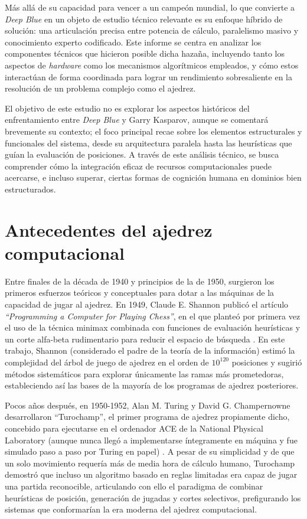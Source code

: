 \documentclass[a4paper, 12pt]{article}
\begin{document}
Más allá de su capacidad para vencer a un campeón mundial, lo 
que convierte a \textit{Deep Blue} en un objeto de estudio 
técnico relevante es su enfoque híbrido de solución: una 
articulación precisa entre potencia de cálculo, paralelismo 
masivo y conocimiento experto codificado. Este informe se centra 
en analizar los componentes técnicos que hicieron posible dicha 
hazaña, incluyendo tanto los aspectos de \emph{hardware} como los 
mecanismos algorítmicos empleados, y cómo estos interactúan de 
forma coordinada para lograr un rendimiento sobresaliente en la 
resolución de un problema complejo como el ajedrez.

El objetivo de este estudio no es explorar los aspectos 
históricos del enfrentamiento entre \textit{Deep Blue} y Garry 
Kasparov, aunque se comentará brevemente su contexto; el foco 
principal recae sobre los elementos estructurales y funcionales 
del sistema, desde su arquitectura paralela hasta las 
heurísticas que guían la evaluación de posiciones. A través de 
este análisis técnico, se busca comprender cómo la integración 
eficaz de recursos computacionales puede acercarse, e incluso 
superar, ciertas formas de cognición humana en dominios bien 
estructurados.


\newpage


\section{Antecedentes del ajedrez computacional}


Entre finales de la década de 1940 y principios de la de 1950, 
surgieron los primeros esfuerzos teóricos y conceptuales para 
dotar a las máquinas de la capacidad de jugar al ajedrez. En 
1949, Claude E. Shannon publicó el artículo \emph{“Programming a 
Computer for Playing Chess”}, en el que planteó por primera vez 
el uso de la técnica minimax combinada con funciones de 
evaluación heurísticas y un corte alfa-beta rudimentario para 
reducir el espacio de búsqueda \cite{shannon1950xxii}. En este 
trabajo, Shannon (considerado el padre de la teoría de la 
información) estimó la complejidad del árbol de juego de ajedrez 
en el orden de \(10^{120}\) posiciones y sugirió métodos 
sistemáticos para explorar únicamente las ramas más prometedoras, 
estableciendo así las bases de la mayoría de los programas de 
ajedrez posteriores.

Pocos años después, en 1950-1952, Alan M. Turing y David G. 
Champernowne desarrollaron “Turochamp”, el primer programa de 
ajedrez propiamente dicho, concebido para ejecutarse en el 
ordenador ACE de la National Physical Laboratory (aunque nunca 
llegó a implementarse íntegramente en máquina y fue simulado 
paso a paso por Turing en papel) \cite{turing1953digital}. A pesar de 
su simplicidad y de que un solo movimiento requería más de media 
hora de cálculo humano, Turochamp demostró que incluso un 
algoritmo basado en reglas limitadas era capaz de jugar una 
partida reconocible, articulando con ello el paradigma de 
combinar heurísticas de posición, generación de jugadas y 
cortes selectivos, prefigurando los sistemas que conformarían la 
era moderna del ajedrez computacional.
\end{document}
